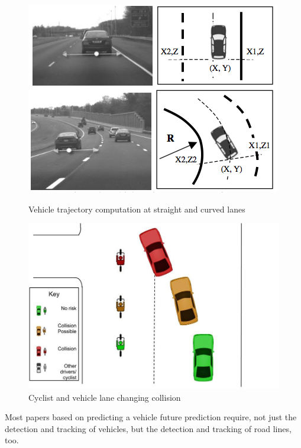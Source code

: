 \documentclass[]{report}
\begin{document}
\begin{figure}
\centering
	\begin{minipage}{0.49\textwidth}
		\centering
		\includegraphics[scale=0.4]{figures/research_paper_figures/trajectory_multi-cue}
		\caption{Vehicle trajectory computation at straight and curved lanes \citep{multi-cue} }
	\end{minipage}\hfill
	\begin{minipage}{0.49\textwidth}
		\centering
		\includegraphics[scale=0.2]{figures/collision_avoidance_figures/Vehicle_changing_lane_into_the_path_of_a_cyclist}
		\caption{Cyclist and vehicle lane changing collision}
	\end{minipage}
\end{figure}



Most papers based on predicting a vehicle future prediction require, not just the detection and tracking of vehicles, but the detection and tracking of road lines, too. 
\end{document}
